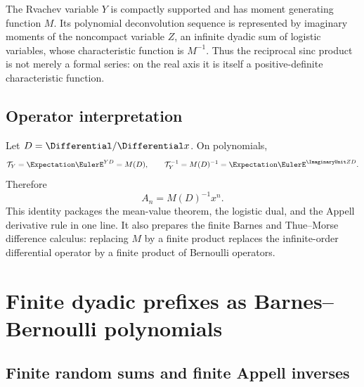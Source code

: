 \documentclass[11pt,oneside]{article}
\numberwithin{equation}{section}
\theoremstyle{definition}
\theoremstyle{remark}
\begin{document}
\begin{resultbox}
The Rvachev variable $Y$ is compactly supported and has moment generating function $M$.  Its
polynomial deconvolution sequence is represented by imaginary moments of the noncompact variable
$Z$, an infinite dyadic sum of logistic variables, whose characteristic function is $M^{-1}$.
Thus the reciprocal sinc product is not merely a formal series: on the real axis it is itself a
positive-definite characteristic function.
\end{resultbox}

\subsection{Operator interpretation}

Let $D=\Differential/\Differential x$.  On polynomials,
\begin{equation}
 \mathcal T_Y=\Expectation\EulerE^{YD}=M(D),
 \qquad
 \mathcal T_Y^{-1}=M(D)^{-1}=\Expectation\EulerE^{\ImaginaryUnit ZD}.
 \label{p2:eq:operator-deconvolution}
\end{equation}
Therefore
\begin{equation}
 A_n=M(D)^{-1}x^n.
 \label{p2:eq:A-operator}
\end{equation}
This identity packages the mean-value theorem, the logistic dual, and the Appell derivative rule in
one line.  It also prepares the finite Barnes and Thue--Morse difference calculus: replacing $M$ by
a finite product replaces the infinite-order differential operator by a finite product of Bernoulli
operators.

\section{Finite dyadic prefixes as Barnes--Bernoulli polynomials}
\label{p2:sec:barnes}

\subsection{Finite random sums and finite Appell inverses}
\end{document}
